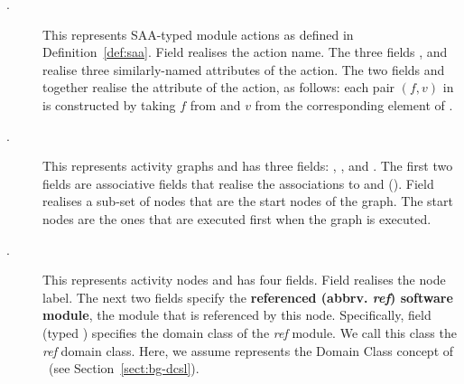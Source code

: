 \begin{description}
\item[.] This represents SAA-typed module actions as defined in Definition~\ref{def:saa}. Field  realises the action name. The three fields ,  and  realise three similarly-named attributes of the action.
%
The two fields  and    together realise the attribute  of the action, as follows: each pair $ (f,v) $ in  is constructed by taking $f$ from  and $v$ from the corresponding element of .
%
\item[.] This represents activity graphs and has three fields: , , and . The first two fields are associative fields that realise the associations to  and  (\resp). Field  realises a sub-set of nodes that are the start nodes of the graph. The start nodes are the ones that are executed first when the graph is executed.
%
\item[.] This represents activity nodes and has four fields. Field  realises the node label. 
The next two fields specify the \textbf{referenced (abbrv. \textit{ref}) software module}, \ie the module that is referenced by this node. Specifically, field  (typed ) specifies the domain class of the \textit{ref} module. We call this class the \textit{ref} domain class. Here, we assume  represents the Domain Class concept of \dcsl~(see Section~\ref{sect:bg-dcsl}).


\end{description}
